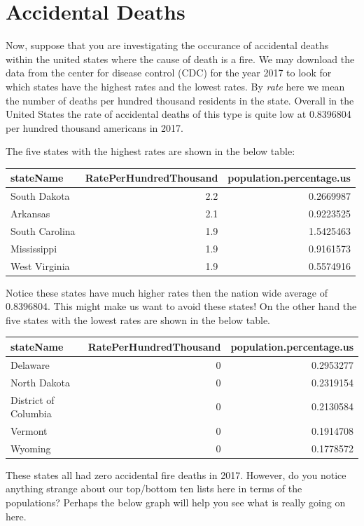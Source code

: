 \documentclass[
]{book}
\theoremstyle{definition}
\theoremstyle{definition}
\theoremstyle{definition}
\theoremstyle{definition}
\theoremstyle{remark}
\begin{document}
\hypertarget{accidental-deaths}{%
\section{Accidental Deaths}\label{accidental-deaths}}

Now, suppose that you are investigating the occurance of accidental deaths within the united states where the cause of death is a fire. We may download the data from the center for disease control (CDC) for the year 2017 to look for which states have the highest rates and the lowest rates. By \emph{rate} here we mean the number of deaths per hundred thousand residents in the state. Overall in the United States the rate of accidental deaths of this type is quite low at 0.8396804 per hundred thousand americans in 2017.

The five states with the highest rates are shown in the below table:

\begin{tabular}{l|r|r}
\hline
stateName & RatePerHundredThousand & population.percentage.us\\
\hline
South Dakota & 2.2 & 0.2669987\\
\hline
Arkansas & 2.1 & 0.9223525\\
\hline
South Carolina & 1.9 & 1.5425463\\
\hline
Mississippi & 1.9 & 0.9161573\\
\hline
West Virginia & 1.9 & 0.5574916\\
\hline
\end{tabular}

Notice these states have much higher rates then the nation wide average of 0.8396804. This might make us want to avoid these states! On the other hand the five states with the lowest rates are shown in the below table.

\begin{tabular}{l|r|r}
\hline
stateName & RatePerHundredThousand & population.percentage.us\\
\hline
Delaware & 0 & 0.2953277\\
\hline
North Dakota & 0 & 0.2319154\\
\hline
District of Columbia & 0 & 0.2130584\\
\hline
Vermont & 0 & 0.1914708\\
\hline
Wyoming & 0 & 0.1778572\\
\hline
\end{tabular}

These states all had zero accidental fire deaths in 2017. However, do you notice anything strange about our top/bottom ten lists here in terms of the populations? Perhaps the below graph will help you see what is really going on here.
\end{document}
